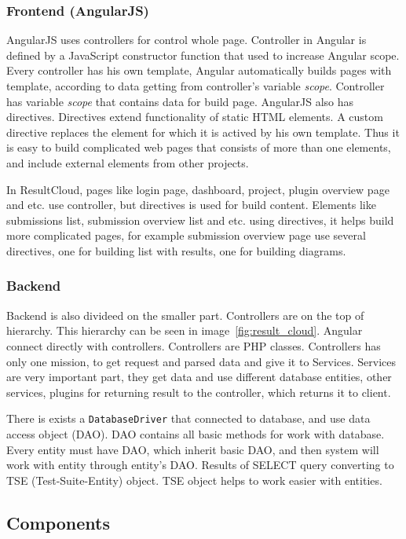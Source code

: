 \subsubsection{Frontend (AngularJS)}

AngularJS uses controllers for control whole page. Controller in Angular is defined by a JavaScript constructor function that used to increase Angular scope. Every controller has his own template, Angular automatically builds pages with template, according to data getting from controller's variable \emph{scope}. Controller has variable \emph{scope} that contains data for build page. AngularJS also has directives. Directives extend functionality of static HTML elements. A custom directive replaces the element for which it is actived by his own template. Thus it is easy to build complicated web pages that consists of more than one elements, and include external elements from other projects.

In ResultCloud, pages like login page, dashboard, project, plugin overview page and etc. use controller, but directives is used for build content. Elements like submissions list, submission overview list and etc. using directives, it helps build more complicated pages, for example submission overview page use several directives, one for building list with results, one for building diagrams. 

\subsubsection{Backend}

Backend is also divideed on the smaller part. Controllers are on the top of hierarchy. This hierarchy can be seen in image\ \ref{fig:result_cloud}. Angular connect directly with controllers. Controllers are PHP classes. Controllers has only one mission, to get request and parsed data and give it to Services. Services are very important part, they get data and use different database entities, other services, plugins for returning result to the controller, which returns it to client.

There is exists a \texttt{DatabaseDriver} that connected to database, and use data access object (DAO). DAO contains all basic methods for work with database. Every entity must have DAO, which inherit basic DAO, and then system will work with entity through entity's DAO. Results of SELECT query converting to TSE (Test-Suite-Entity) object. TSE object helps to work easier with entities.


\subsection{Components}

